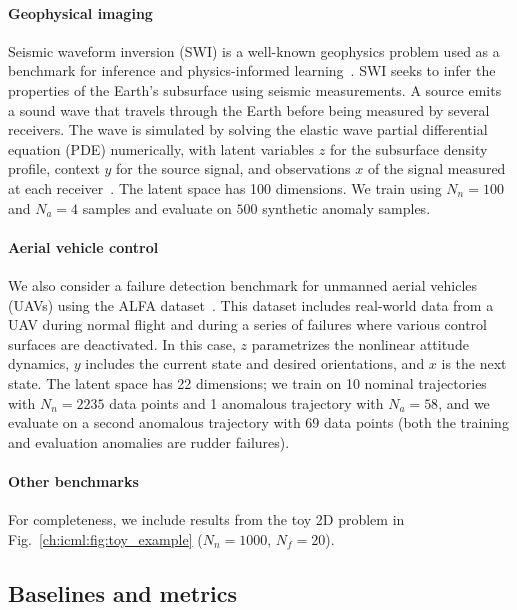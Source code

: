 \paragraph{Geophysical imaging} Seismic waveform inversion (SWI) is a well-known geophysics problem used as a benchmark for inference and physics-informed learning~\cite{gouveiaBayesianSeismicWaveform1998,dengOpenFWILargescaleMultistructural2022,zhangBayesianSpatialModelling2016}. SWI seeks to infer the properties of the Earth's subsurface using seismic measurements. A source emits a sound wave that travels through the Earth before being measured by several receivers. The wave is simulated by solving the elastic wave partial differential equation (PDE) numerically, with latent variables $z$ for the subsurface density profile, context $y$ for the source signal, and observations $x$ of the signal measured at each receiver~\cite{richardsonDeepwave2023}. The latent space has 100 dimensions. We train using $N_n = 100$ and $N_a = 4$ samples and evaluate on $500$ synthetic anomaly samples.

\paragraph{Aerial vehicle control} We also consider a failure detection benchmark for unmanned aerial vehicles (UAVs) using the ALFA dataset~\cite{keipourALFADatasetUAV2021}. This dataset includes real-world data from a UAV during normal flight and during a series of failures where various control surfaces are deactivated. In this case, $z$ parametrizes the nonlinear attitude dynamics, $y$ includes the current state and desired orientations, and $x$ is the next state. The latent space has 22 dimensions; we train on 10 nominal trajectories with $N_n = 2235$ data points and 1 anomalous trajectory with $N_a = 58$, and we evaluate on a second anomalous trajectory with $69$ data points (both the training and evaluation anomalies are rudder failures).

\paragraph{Other benchmarks} For completeness, we include results from the toy 2D problem in Fig.~\ref{ch:icml:fig:toy_example} ($N_n = 1000$, $N_f = 20$).

\subsection{Baselines and metrics}


